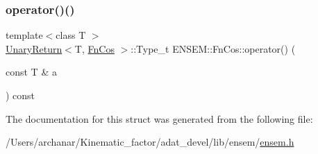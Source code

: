 \mbox{\label{structENSEM_1_1FnCos_a446b9cdd3e854285292e8159b45b0a58}} 
\subsubsection{\texorpdfstring{operator()()}{operator()()}\hspace{0.1cm}{\footnotesize\ttfamily [2/2]}}
{\footnotesize\ttfamily template$<$class T $>$ \\
\mbox{\hyperlink{structENSEM_1_1UnaryReturn}{Unary\+Return}}$<$T, \mbox{\hyperlink{structENSEM_1_1FnCos}{Fn\+Cos}} $>$\+::Type\+\_\+t E\+N\+S\+E\+M\+::\+Fn\+Cos\+::operator() (\begin{DoxyParamCaption}\item[{const T \&}]{a }\end{DoxyParamCaption}) const\hspace{0.3cm}{\ttfamily [inline]}}



The documentation for this struct was generated from the following file\+:\begin{DoxyCompactItemize}
\item 
/\+Users/archanar/\+Kinematic\+\_\+factor/adat\+\_\+devel/lib/ensem/\mbox{\hyperlink{lib_2ensem_2ensem_8h}{ensem.\+h}}\end{DoxyCompactItemize}
